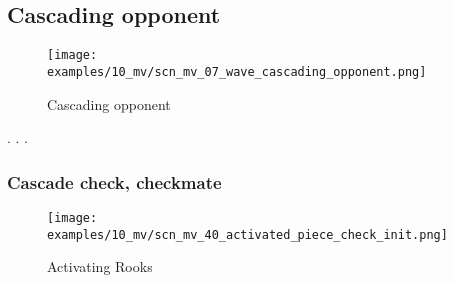 \clearpage %

\subsection*{Cascading opponent}

\vspace*{-3.0ex}
\noindent
\begin{figure}[h]
\texttt{[image: examples/10\_mv/scn\_mv\_07\_wave\_cascading\_opponent.png]}
\caption{Cascading opponent}
\label{fig:scn_mv_07_wave_cascading_opponent}
\end{figure}

. . .





\clearpage %

\subsubsection*{Cascade check, checkmate}

\vspace*{-1.4\baselineskip}
\noindent
\begin{figure}[!h]
\texttt{[image: examples/10\_mv/scn\_mv\_40\_activated\_piece\_check\_init.png]}
\vspace*{-1.3\baselineskip}
\caption{Activating Rooks}
\label{fig:scn_mv_40_activated_piece_check_init}
\end{figure}

